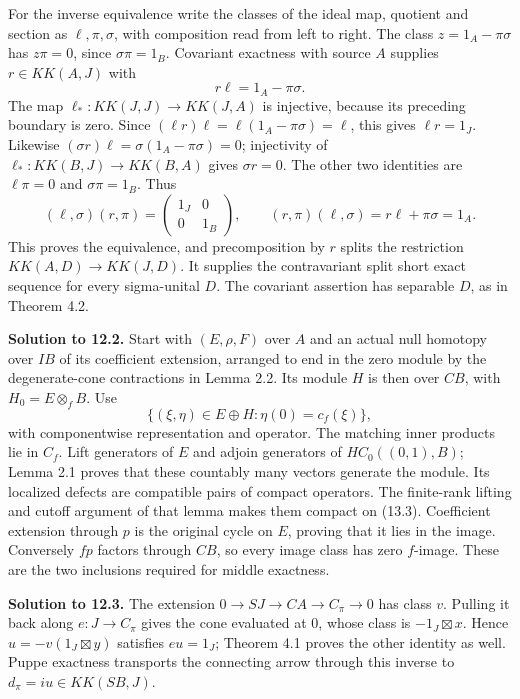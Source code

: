 \documentclass[
  11pt,
]{article}
\begin{document}
For the inverse equivalence write the classes of the ideal map, quotient
and section as \(\ell,\pi,\sigma\), with composition read from left to
right. The class \(z=1_A-\pi\sigma\) has \(z\pi=0\), since
\(\sigma\pi=1_B\). Covariant exactness with source \(A\) supplies
\(r\in KK(A,J)\) with \[
r\ell=1_A-\pi\sigma.
\tag{13.1}
\] The map \(\ell_*:KK(J,J)\to KK(J,A)\) is injective, because its
preceding boundary is zero. Since
\((\ell r)\ell=\ell(1_A-\pi\sigma)=\ell\), this gives \(\ell r=1_J\).
Likewise \((\sigma r)\ell=\sigma(1_A-\pi\sigma)=0\); injectivity of
\(\ell_*:KK(B,J)\to KK(B,A)\) gives \(\sigma r=0\). The other two
identities are \(\ell\pi=0\) and \(\sigma\pi=1_B\). Thus \[
(\ell,\sigma)(r,\pi)=
\begin{pmatrix}1_J&0\\0&1_B\end{pmatrix},
\qquad
(r,\pi)(\ell,\sigma)=r\ell+\pi\sigma=1_A.
\tag{13.2}
\] This proves the equivalence, and precomposition by \(r\) splits the
restriction \(KK(A,D)\to KK(J,D)\). It supplies the contravariant split
short exact sequence for every sigma-unital \(D\). The covariant
assertion has separable \(D\), as in Theorem 4.2.

\textbf{Solution to 12.2.} Start with \((E,\rho,F)\) over \(A\) and an
actual null homotopy over \(IB\) of its coefficient extension, arranged
to end in the zero module by the degenerate-cone contractions in Lemma
2.2. Its module \(H\) is then over \(CB\), with \(H_0=E\otimes_f B\).
Use \[
\{(\xi,\eta)\in E\oplus H:\eta(0)=c_f(\xi)\},
\tag{13.3}
\] with componentwise representation and operator. The matching inner
products lie in \(C_f\). Lift generators of \(E\) and adjoin generators
of \(H C_0((0,1),B)\); Lemma 2.1 proves that these countably many
vectors generate the module. Its localized defects are compatible pairs
of compact operators. The finite-rank lifting and cutoff argument of
that lemma makes them compact on (13.3). Coefficient extension through
\(p\) is the original cycle on \(E\), proving that it lies in the image.
Conversely \(fp\) factors through \(CB\), so every image class has zero
\(f\)-image. These are the two inclusions required for middle exactness.

\textbf{Solution to 12.3.} The extension \(0\to SJ\to CA\to C_\pi\to0\)
has class \(v\). Pulling it back along \(e:J\to C_\pi\) gives the cone
evaluated at 0, whose class is \(-1_J\boxtimes x\). Hence
\(u=-v(1_J\boxtimes y)\) satisfies \(eu=1_J\); Theorem 4.1 proves the
other identity as well. Puppe exactness transports the connecting arrow
through this inverse to \(d_\pi=iu\in KK(SB,J)\).
\end{document}
